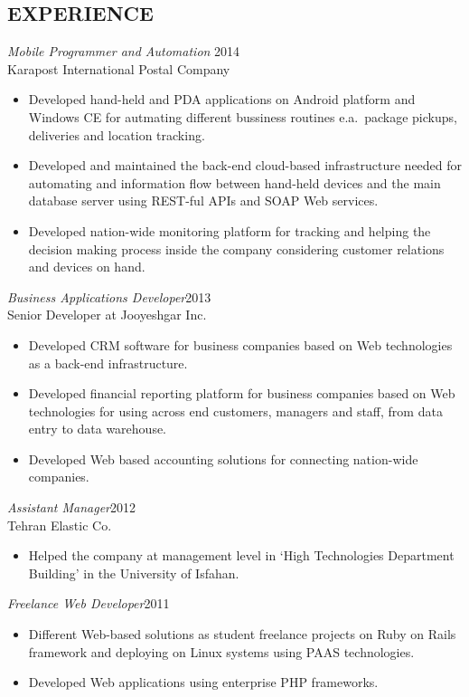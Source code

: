 \documentclass[margin, 10pt]{res} %
\begin{document}
\begin{resume}
\section{EXPERIENCE}

{\sl Mobile Programmer and Automation} \hfill 2014 \\
Karapost International Postal Company

\begin{itemize} \itemsep -2pt %
\item Developed hand-held and PDA applications on Android platform and Windows CE for autmating different bussiness
  routines e.a.\ package pickups, deliveries and location tracking.
\item Developed and maintained the back-end cloud-based infrastructure needed for automating and information flow between
  hand-held devices and the main database server using REST-ful APIs and SOAP Web services.
\item Developed nation-wide monitoring platform for tracking and helping the
  decision making process inside the company considering customer relations and devices on hand.
\end{itemize}
 
{\sl Business Applications Developer}\hfill 2013 \\
Senior Developer at Jooyeshgar Inc.
\begin{itemize} 
\item Developed CRM software for business companies based on Web technologies as a back-end infrastructure.
\item Developed financial reporting platform for business companies based on Web
  technologies for using across end customers, managers and staff, from data entry
  to data warehouse.
\item Developed Web based accounting solutions for connecting nation-wide companies.
\end{itemize} 

{\sl Assistant Manager}\hfill 2012 \\
Tehran Elastic Co.
\begin{itemize}
\item Helped the company at management level in `High Technologies Department
  Building' in the University of Isfahan.
\end{itemize} 

{\sl Freelance Web Developer}\hfill 2011 \\
\begin{itemize}
\item Different Web-based solutions as student freelance projects on Ruby on Rails
  framework and deploying on Linux systems using PAAS technologies.
\item Developed Web applications using enterprise PHP frameworks.
\end{itemize} 


\end{resume}
\end{document}
